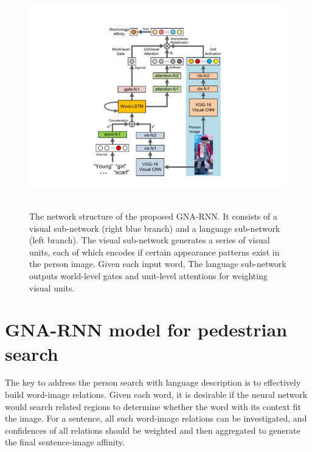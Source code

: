 \begin{figure}
\begin{center}
\includegraphics[width=0.7\linewidth]{figures/person_nlp/GNA-RNN_bolei.pdf} \ \\
\end{center}
\vspace{-6pt}
\caption{The network structure of the proposed GNA-RNN. It consists of a visual sub-network (right blue branch) and a language sub-network (left branch). The visual sub-network generates a series of visual units, each of which encodes if certain appearance patterns exist in the person image. Given each input word, The language sub-network outputs world-level gates and unit-level attentions for weighting visual units.}
\label{fig:GNARNN}
\vspace{-7pt}
\end{figure}


\section{GNA-RNN model for pedestrian search}

The key to address the person search with language description is to effectively build word-image relations. Given each word, it is desirable if the neural network would search related regions to determine whether the word with its context fit the image. For a sentence, all such word-image relations can be investigated, and confidences of all relations should be weighted and then aggregated to generate the final sentence-image affinity.

